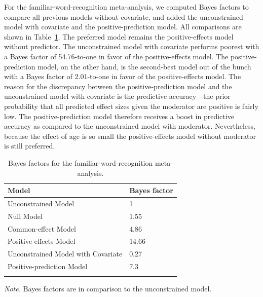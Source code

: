 \documentclass[english,,man]{apa6}
\begin{document}
For the familiar-word-recognition meta-analysis, we computed Bayes factors to compare all previous models without covariate, and added the unconstrained model with covariate and the positive-prediction model. All comparisons are shown in Table~\ref{tab:covariate-tab}. The preferred model remains the positive-effects model without predictor. The unconstrained model with covariate performs poorest with a Bayes factor of 54.76-to-one in favor of the positive-effects model. The positive-prediction model, on the other hand, is the second-best model out of the bunch with a Bayes factor of 2.01-to-one in favor of the positive-effects model. The reason for the discrepancy between the positive-prediction model and the unconstrained model with covariate is the predictive accuracy---the prior probability that all predicted effect sizes given the moderator are positive is fairly low. The positive-prediction model therefore receives a boost in predictive accuracy as compared to the unconstrained model with moderator. Nevertheless, because the effect of age is so small the positive-effects model without moderator is still preferred.

\begin{table}[tbp]

\begin{center}
\begin{threeparttable}

\caption{\label{tab:covariate-tab}Bayes factors for the familiar-word-recognition meta-analysis.}

\begin{tabular}{ll}
\toprule
Model & \multicolumn{1}{c}{Bayes factor}\\
\midrule
Unconstrained Model & 1\\
Null Model & 1.55\\
Common-effect Model & 4.86\\
Positive-effects Model & 14.66\\
Unconstrained Model with Covariate & 0.27\\
Positive-prediction Model & 7.3\\
\bottomrule
\addlinespace
\end{tabular}

\begin{tablenotes}[para]
\normalsize{\textit{Note.} Bayes factors are in comparison to the unconstrained model.}
\end{tablenotes}

\end{threeparttable}
\end{center}

\end{table}
\end{document}
